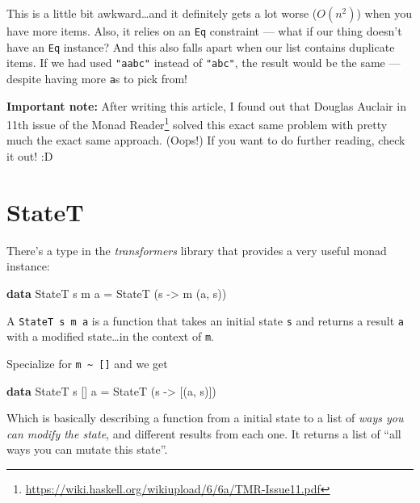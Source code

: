 \documentclass[]{article}
\newenvironment{Shaded}{}{}
\newcommand{\DataTypeTok}[1]{\textcolor[rgb]{0.56,0.13,0.00}{#1}}
\newcommand{\KeywordTok}[1]{\textcolor[rgb]{0.00,0.44,0.13}{\textbf{#1}}}
\newcommand{\NormalTok}[1]{#1}
\newcommand{\OtherTok}[1]{\textcolor[rgb]{0.00,0.44,0.13}{#1}}
\renewcommand{\href}[2]{#2\footnote{\url{#1}}}
\begin{document}
This is a little bit awkward\ldots and it definitely gets a lot worse
(\(O(n^2)\)) when you have more items. Also, it relies on an \texttt{Eq}
constraint --- what if our thing doesn't have an \texttt{Eq} instance? And this
also falls apart when our list contains duplicate items. If we had used
\texttt{"aabc"} instead of \texttt{"abc"}, the result would be the same ---
despite having more \texttt{\textquotesingle{}a\textquotesingle{}}s to pick
from!

\textbf{Important note:} After writing this article, I found out that Douglas
Auclair in \href{https://wiki.haskell.org/wikiupload/6/6a/TMR-Issue11.pdf}{11th
issue of the Monad Reader} solved this exact same problem with pretty much the
exact same approach. (Oops!) If you want to do further reading, check it out! :D

\section{StateT}\label{statet}

There's a type in the \emph{transformers} library that provides a very useful
monad instance:

\begin{Shaded}
\begin{Highlighting}[]
\KeywordTok{data} \DataTypeTok{StateT}\NormalTok{ s m a }\OtherTok{=} \DataTypeTok{StateT}\NormalTok{ (s }\OtherTok{{-}\textgreater{}}\NormalTok{ m (a, s))}
\end{Highlighting}
\end{Shaded}

A \texttt{StateT\ s\ m\ a} is a function that takes an initial state \texttt{s}
and returns a result \texttt{a} with a modified state\ldots in the context of
\texttt{m}.

Specialize for \texttt{m\ \textasciitilde{}\ {[}{]}} and we get

\begin{Shaded}
\begin{Highlighting}[]
\KeywordTok{data} \DataTypeTok{StateT}\NormalTok{ s [] a }\OtherTok{=} \DataTypeTok{StateT}\NormalTok{ (s }\OtherTok{{-}\textgreater{}}\NormalTok{ [(a, s)])}
\end{Highlighting}
\end{Shaded}

Which is basically describing a function from a initial state to a list of
\emph{ways you can modify the state}, and different results from each one. It
returns a list of ``all ways you can mutate this state''.
\end{document}
